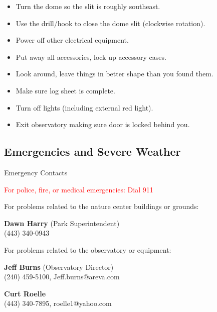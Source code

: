 
\begin{frame}{\insertsubsectionhead}
  \Large
  \begin{itemize}
    \item Turn the dome so the slit is roughly southeast.
    \item Use the drill/hook to close the dome slit (clockwise rotation).
    \item Power off other electrical equipment.
    \item Put away all accessories, lock up accessory cases.
    \item Look around, leave things in better shape than you found them.
    \item Make sure log sheet is complete.
    \item Turn off lights (including external red light).
    \item Exit observatory making sure door is locked behind you.
  \end{itemize}
 \end{frame}

\subsection{Emergencies and Severe Weather}
\begin{frame}[t]{Emergency Contacts}
  
  {\LARGE\centering
  \textcolor{red}{For police, fire, or medical emergencies: Dial 911}}

  For problems related to the nature center buildings or grounds:

  \textbf{Dawn Harry} (Park Superintendent)\\
  (443) 340-0943

  For problems related to the observatory or equipment:

  \textbf{Jeff Burns} (Observatory Director)\\
  (240) 459-5100, Jeff.burns@areva.com

  \textbf{Curt Roelle}\\
  (443) 340-7895, roelle1@yahoo.com 
\end{frame}


